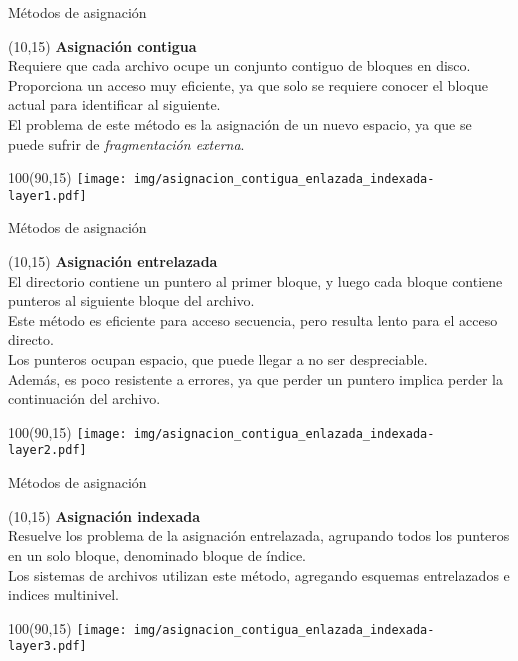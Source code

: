 \documentclass[aspectratio=169]{beamer}
\begin{document}
\begin{frame}[fragile,t]{Métodos de asignación}
    \begin{textblock}{76}(10,15) 
    \textbf{Asignación contigua}\\
    Requiere que cada archivo ocupe un conjunto contiguo de bloques en disco.\\
    Proporciona un acceso muy eficiente, ya que solo se requiere conocer el bloque actual para identificar al siguiente.\\
    El problema de este método es la asignación de un nuevo espacio, ya que se puede sufrir de \emph{fragmentación externa}.
    \end{textblock}
    \begin{textblock}{100}(90,15) \texttt{[image: img/asignacion\_contigua\_enlazada\_indexada-layer1.pdf]} \end{textblock}
\end{frame}

\begin{frame}[fragile,t]{Métodos de asignación}
    \begin{textblock}{76}(10,15) 
    \textbf{Asignación entrelazada}\\
    El directorio contiene un puntero al primer bloque, y luego cada bloque contiene punteros al siguiente bloque del archivo.\\
    Este método es eficiente para acceso secuencia, pero resulta lento para el acceso directo.\\
    Los punteros ocupan espacio, que puede llegar a no ser despreciable.\\
    Además, es poco resistente a errores, ya que perder un puntero implica perder la continuación del archivo.
    \end{textblock}
    \begin{textblock}{100}(90,15) \texttt{[image: img/asignacion\_contigua\_enlazada\_indexada-layer2.pdf]} \end{textblock}
\end{frame}

\begin{frame}[fragile,t]{Métodos de asignación}
    \begin{textblock}{76}(10,15) 
    \textbf{Asignación indexada}\\
    Resuelve los problema de la asignación entrelazada, agrupando todos los punteros en un solo bloque, denominado bloque de índice.\\
    Los sistemas de archivos utilizan este método, agregando esquemas entrelazados e indices multinivel.
    \end{textblock}
    \begin{textblock}{100}(90,15) \texttt{[image: img/asignacion\_contigua\_enlazada\_indexada-layer3.pdf]} \end{textblock}
\end{frame}
\end{document}
